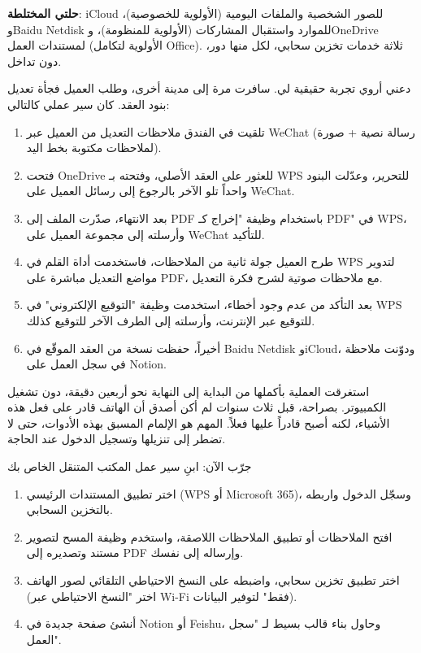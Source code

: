 \textbf{حلتي المختلطة}: iCloud للصور الشخصية والملفات اليومية (الأولوية للخصوصية)، وBaidu Netdisk للموارد واستقبال المشاركات (الأولوية للمنظومة)، وOneDrive لمستندات العمل (الأولوية لتكامل Office). ثلاثة خدمات تخزين سحابي، لكل منها دور، دون تداخل.


دعني أروي تجربة حقيقية لي. سافرت مرة إلى مدينة أخرى، وطلب العميل فجأة تعديل بنود العقد. كان سير عملي كالتالي:

\begin{enumerate}
  \item تلقيت في الفندق ملاحظات التعديل من العميل عبر WeChat (رسالة نصية + صورة لملاحظات مكتوبة بخط اليد).
  \item فتحت OneDrive للعثور على العقد الأصلي، وفتحته بـ WPS للتحرير، وعدّلت البنود واحداً تلو الآخر بالرجوع إلى رسائل العميل على WeChat.
  \item بعد الانتهاء، صدّرت الملف إلى PDF باستخدام وظيفة "إخراج كـ PDF" في WPS، وأرسلته إلى مجموعة العميل على WeChat للتأكيد.
  \item طرح العميل جولة ثانية من الملاحظات، فاستخدمت أداة القلم في WPS لتدوير مواضع التعديل مباشرة على PDF، مع ملاحظات صوتية لشرح فكرة التعديل.
  \item بعد التأكد من عدم وجود أخطاء، استخدمت وظيفة "التوقيع الإلكتروني" في WPS للتوقيع عبر الإنترنت، وأرسلته إلى الطرف الآخر للتوقيع كذلك.
  \item أخيراً، حفظت نسخة من العقد الموقّع في Baidu Netdisk وiCloud، ودوّنت ملاحظة في سجل العمل على Notion.
\end{enumerate}

استغرقت العملية بأكملها من البداية إلى النهاية نحو أربعين دقيقة، دون تشغيل الكمبيوتر. بصراحة، قبل ثلاث سنوات لم أكن أصدق أن الهاتف قادر على فعل هذه الأشياء، لكنه أصبح قادراً عليها فعلاً. المهم هو الإلمام المسبق بهذه الأدوات، حتى لا تضطر إلى تنزيلها وتسجيل الدخول عند الحاجة.

\begin{tcbpractice}{جرّب الآن: ابنِ سير عمل المكتب المتنقل الخاص بك}
\begin{enumerate}
  \item اختر تطبيق المستندات الرئيسي (WPS أو Microsoft 365)، وسجّل الدخول واربطه بالتخزين السحابي.
  \item افتح الملاحظات أو تطبيق الملاحظات اللاصقة، واستخدم وظيفة المسح لتصوير مستند وتصديره إلى PDF وإرساله إلى نفسك.
  \item اختر تطبيق تخزين سحابي، واضبطه على النسخ الاحتياطي التلقائي لصور الهاتف (اختر "النسخ الاحتياطي عبر Wi-Fi فقط" لتوفير البيانات).
  \item أنشئ صفحة جديدة في Notion أو Feishu، وحاول بناء قالب بسيط لـ "سجل العمل".
\end{enumerate}

\end{tcbpractice}
